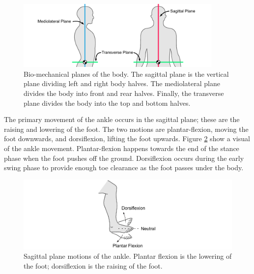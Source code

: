 \begin{figure}[!hbt]
    \centering
    \includegraphics[width=0.9\textwidth]{content/2-Background/body_planes.pdf}
    \caption[Bio-mechanical planes of the body]{Bio-mechanical planes of the body. The sagittal plane is the vertical plane dividing left and right body halves. The mediolateral plane divides the body into front and rear halves. Finally, the transverse plane divides the body into the top and bottom halves.}
    \label{fig:background_planes_of_the_body}
\end{figure}

The primary movement of the ankle occurs in the sagittal plane; these are the raising and lowering of the foot. The two motions are plantar-flexion, moving the foot downwards, and dorsiflexion, lifting the foot upwards.\cite{Bartlett2007} Figure \ref{fig:background_plantar_dorsi_flexion} show a visual of the ankle movement.  Plantar-flexion happens towards the end of the stance phase when the foot pushes off the ground. Dorsiflexion occurs during the early swing phase to provide enough toe clearance as the foot passes under the body.\cite{Whittle2012}

\begin{figure}[!hbt]
    \centering
    \includegraphics[width=\textwidth]{content/2-Background/Ankle_Flexion.pdf}
    \caption[Sagittal plane motions of the ankle]{Sagittal plane motions of the ankle. Plantar flexion is the lowering of the foot; dorsiflexion is the raising of the foot.}
    \label{fig:background_plantar_dorsi_flexion}
\end{figure}

